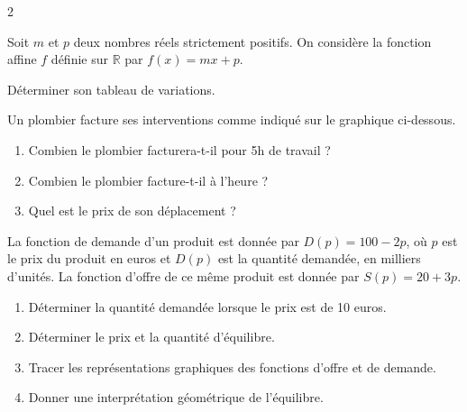 \documentclass[10pt,a4paper]{article}
\begin{document}
\begin{multicols}{2}
\begin{exo}[][appro]
    Soit \(m\) et \(p\) deux nombres réels strictement positifs. On considère la fonction affine \(f\) définie sur \(\mathbb{R}\) par \(f(x)=mx+p\).

    \smallskip

    Déterminer son tableau de variations.
    
\end{exo}

\begin{exo}[][appro]
    Un plombier facture ses interventions comme indiqué sur le graphique ci-dessous.
    
    \begin{enumerate}
        \item Combien le plombier facturera-t-il pour 5h de travail ?
        \item Combien le plombier facture-t-il à l'heure ?
        \item Quel est le prix de son déplacement ?
    \end{enumerate}
\end{exo}


\begin{exo}[][avance]
    
    La fonction de demande d'un produit est donnée par \(D(p)=100-2p\), où \(p\) est le prix du produit en euros et \(D(p)\) est la quantité demandée, en milliers d'unités. La fonction d'offre de ce même produit est donnée par \(S(p)=20+3p\).

    \begin{enumerate}[leftmargin=*]
        \item Déterminer la quantité demandée lorsque le prix est de 10 euros.
        \item Déterminer le prix et la quantité d'équilibre.
        \item Tracer les représentations graphiques des fonctions d'offre et de demande.
        \item Donner une interprétation géométrique de l'équilibre.


\end{enumerate}
\end{exo}
\end{multicols}
\end{document}
